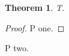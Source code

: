 \documentclass{elsarticle}
\newtheorem{thm}{Theorem}
\begin{document}
\begin{thm} T. \end{thm}
\begin{proof} P one. \end{proof}
\begin{pf} P two. \end{pf}
\end{document}
